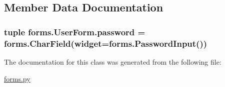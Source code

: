 \subsection{Member Data Documentation}
\hypertarget{classforms_1_1_user_form_af36c6d916f8374e9c6940810af92d95e}{
\subsubsection[{password}]{\setlength{\rightskip}{0pt plus 5cm}tuple forms.\-User\-Form.\-password = forms.\-Char\-Field(widget=forms.\-Password\-Input())\hspace{0.3cm}{\ttfamily [static]}}}\label{classforms_1_1_user_form_af36c6d916f8374e9c6940810af92d95e}


The documentation for this class was generated from the following file\-:\begin{DoxyCompactItemize}
\item 
\hyperlink{forms_8py}{forms.\-py}\end{DoxyCompactItemize}
